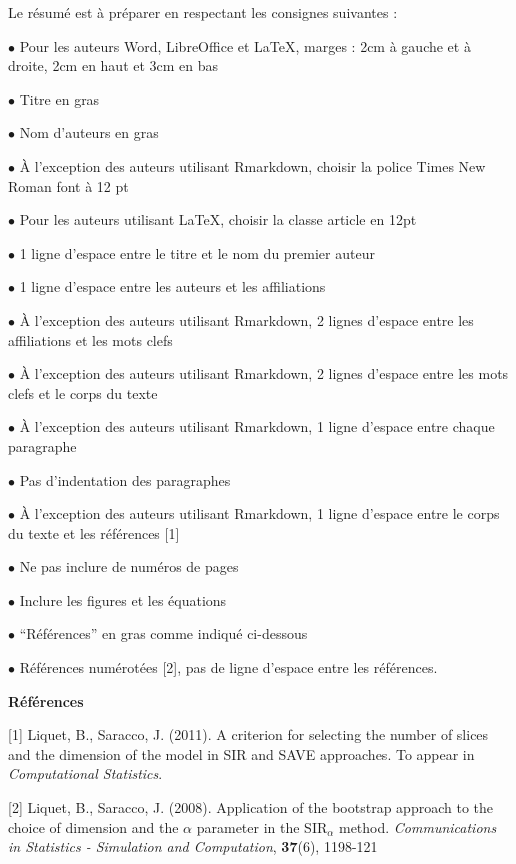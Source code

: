 \documentclass[12pt]{article}
\begin{document}
\vspace{12pt}

Le r\'esum\'e est \`a pr\'eparer en respectant les consignes suivantes :

$\bullet$ Pour les auteurs Word, LibreOffice et LaTeX, marges : 2cm \`a gauche 
et \`a droite, 2cm en haut et 3cm en bas

$\bullet$ Titre en gras

$\bullet$ Nom d'auteurs en gras

$\bullet$ \`A l'exception des auteurs utilisant Rmarkdown, choisir la police 
Times New Roman font \`a 12 pt

$\bullet$ Pour les auteurs utilisant LaTeX, choisir la classe article en 12pt

$\bullet$ 1 ligne d'espace entre le titre et le nom du premier auteur

$\bullet$ 1 ligne d'espace entre les auteurs et les affiliations

$\bullet$ \`A l'exception des auteurs utilisant Rmarkdown, 2 lignes d'espace 
entre les affiliations et les mots clefs

$\bullet$ \`A l'exception des auteurs utilisant Rmarkdown, 2 lignes d'espace 
entre les mots clefs et le corps du texte

$\bullet$ \`A l'exception des auteurs utilisant Rmarkdown, 1 ligne d'espace 
entre chaque paragraphe

$\bullet$ Pas d'indentation des paragraphes

$\bullet$ \`A l'exception des auteurs utilisant Rmarkdown, 1 ligne d'espace 
entre le corps du texte et les r\'ef\'erences [1]

$\bullet$ Ne pas inclure de num\'eros de pages

$\bullet$ Inclure les figures et les \'equations

$\bullet$ ``R\'ef\'erences'' en gras comme indiqu\'e ci-dessous

$\bullet$ R\'ef\'erences num\'erot\'ees [2], pas de ligne d'espace entre les 
r\'ef\'erences.


\vspace{12pt}

\parindent=0pt
{\bf R\'ef\'erences}

[1] Liquet, B., Saracco, J. (2011). A criterion for selecting the number of slices and the dimension of the model in SIR and SAVE approaches. To appear in {\it Computational Statistics}.

[2] Liquet, B., Saracco, J. (2008). Application of the bootstrap approach to the choice of dimension and the $\alpha$ parameter in the SIR$_\alpha$ method. {\it Communications in Statistics - Simulation and Computation}, {\bf 37}(6), 1198-121
\end{document}
